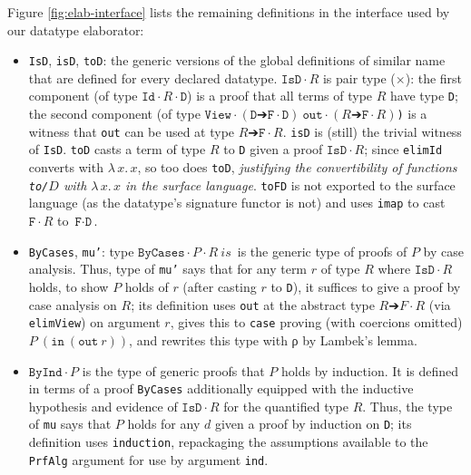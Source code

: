 \documentclass{article}
\newcommand{\absu}[3]{{#1}\, #2.\, #3}
\begin{document}
Figure \ref{fig:elab-interface} lists the remaining definitions in the interface used by our
datatype elaborator:

\begin{itemize}
\item \texttt{IsD}, \texttt{isD}, \texttt{toD}: the generic versions of
  the global definitions of similar name that are defined for every declared
  datatype. $\texttt{IsD} ·R$ is pair type ($\times$): the first
  component (of type \(\texttt{Id} ·R ·\texttt{D}\)) is a proof that all terms of type $R$
  have type \texttt{D}; the second component (of type \(\texttt{View} ·(\texttt{D}
  ➔ \texttt{F} ·\texttt{D})\ \texttt{out} ·(R ➔ \texttt{F} ·R)\)\texttt) is a
  witness that \texttt{out} can be used at type \(R ➔
  \texttt{F} ·R\).
  \texttt{isD} is (still) the trivial witness of \texttt{IsD}. \texttt{toD} casts a
  term of type $R$ to \texttt{D} given a proof \(\texttt{IsD} ·R\); since
  \texttt{elimId} converts with $\absu{λ}{x}{x}$, so too does \texttt{toD},
  \textit{justifying the convertibility of functions \texttt{to/$D$} with \(\absu{λ}{x}{x}\) in the
    surface language}. \texttt{toFD} is not exported to the
  surface language (as the datatype's signature functor is not) and uses
  \texttt{imap} to cast \(\texttt{F} ·R\) to \(\texttt{F} ·\texttt{D}\).
  
\item \texttt{ByCases}, \texttt{mu'}: type \(\texttt{ByCases} ·P ·R\ is\,\) is the generic
  type of proofs of $P$ by case analysis. Thus,
  type of \texttt{mu'} says 
  that for any term $r$ of type $R$ where \(\texttt{IsD} ·R\) holds, to show
  $P$ holds of $r$ (after casting $r$ to \texttt{D}), it suffices to give a
  proof by case analysis on $R$; its definition uses \texttt{out} at the abstract type
  $R ➔ F ·R$ (via \texttt{elimView}) on argument $r$, gives this to
  \texttt{case} proving (with coercions omitted) \(P\ (\texttt{in}\
  (\texttt{out}\ r))\), and rewrites this type with ρ by Lambek's lemma.

\item \(\texttt{ByInd} · P\) is the type of generic proofs that $P$ holds by
  induction. It is defined in terms of a proof \texttt{ByCases} additionally
  equipped with the inductive hypothesis and evidence of \(\texttt{IsD} ·R\) for
  the quantified type $R$. Thus, the type of \texttt{mu} says that $P$ holds for any $d$ given a proof by
  induction on \texttt{D}; its definition uses \texttt{induction}, repackaging the
  assumptions available to the \texttt{PrfAlg} argument for use by argument \texttt{ind}.
\end{itemize}
\end{document}
